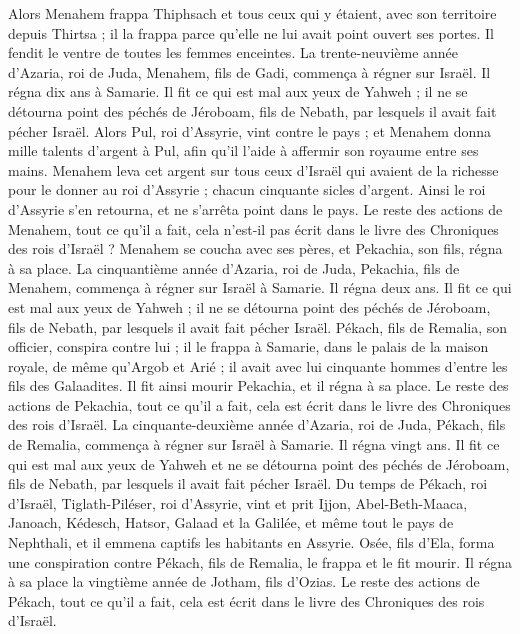 \begin{multicols}{2}
Alors Menahem frappa Thiphsach et tous ceux qui y étaient, avec son territoire depuis Thirtsa ; il la frappa parce qu’elle ne lui avait point ouvert ses portes. Il fendit le ventre de toutes les femmes enceintes.
La trente-neuvième année d’Azaria, roi de Juda, Menahem, fils de Gadi, commença à régner sur Israël. Il régna dix ans à Samarie.
Il fit ce qui est mal aux yeux de Yahweh ; il ne se détourna point des péchés de Jéroboam, fils de Nebath, par lesquels il avait fait pécher Israël.
Alors Pul, roi d’Assyrie, vint contre le pays ; et Menahem donna mille talents d’argent à Pul, afin qu’il l’aide à affermir son royaume entre ses mains.
Menahem leva cet argent sur tous ceux d’Israël qui avaient de la richesse pour le donner au roi d’Assyrie ; chacun cinquante sicles d’argent. Ainsi le roi d’Assyrie s’en retourna, et ne s’arrêta point dans le pays.
Le reste des actions de Menahem, tout ce qu’il a fait, cela n’est-il pas écrit dans le livre des Chroniques des rois d’Israël ?
Menahem se coucha avec ses pères, et Pekachia, son fils, régna à sa place.
La cinquantième année d’Azaria, roi de Juda, Pekachia, fils de Menahem, commença à régner sur Israël à Samarie. Il régna deux ans.
Il fit ce qui est mal aux yeux de Yahweh ; il ne se détourna point des péchés de Jéroboam, fils de Nebath, par lesquels il avait fait pécher Israël.
Pékach, fils de Remalia, son officier, conspira contre lui ; il le frappa à Samarie, dans le palais de la maison royale, de même qu’Argob et Arié ; il avait avec lui cinquante hommes d’entre les fils des Galaadites. Il fit ainsi mourir Pekachia, et il régna à sa place.
Le reste des actions de Pekachia, tout ce qu’il a fait, cela est écrit dans le livre des Chroniques des rois d’Israël.
La cinquante-deuxième année d’Azaria, roi de Juda, Pékach, fils de Remalia, commença à régner sur Israël à Samarie. Il régna vingt ans.
Il fit ce qui est mal aux yeux de Yahweh et ne se détourna point des péchés de Jéroboam, fils de Nebath, par lesquels il avait fait pécher Israël.
Du temps de Pékach, roi d’Israël, Tiglath-Piléser, roi d’Assyrie, vint et prit Ijjon, Abel-Beth-Maaca, Janoach, Kédesch, Hatsor, Galaad et la Galilée, et même tout le pays de Nephthali, et il emmena captifs les habitants en Assyrie.
Osée, fils d’Ela, forma une conspiration contre Pékach, fils de Remalia, le frappa et le fit mourir. Il régna à sa place la vingtième année de Jotham, fils d’Ozias.
Le reste des actions de Pékach, tout ce qu’il a fait, cela est écrit dans le livre des Chroniques des rois d’Israël.

\end{multicols}
